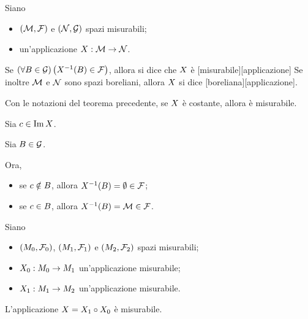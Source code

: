 \begin{Definition}
	Siano
  \begin{itemize}
    \item $(\mathcal{M},\mathcal{F})$ e
      $(\mathcal{N},\mathcal{G})$ spazi misurabili;
    \item un'applicazione $X: \mathcal{M} \rightarrow
      \mathcal{N}$.
  \end{itemize}
  Se $\left ( \forall B \in \mathcal{G} \right ) \left ( X^{-1}(B) \in \mathcal{F} \right )$, allora
  si dice che $X$ \`e
  [misurabile][applicazione]
  Se inoltre $\mathcal{M}$ e $\mathcal{N}$ sono spazi boreliani,
  allora
  $X$ si dice
  [boreliana][applicazione].
\end{Definition}
\begin{Theorem}
  Con le notazioni del teorema precedente,
  se $X$ \`e costante, allora \`e misurabile.
\end{Theorem}
\Proof Sia $c \in \operatorname{Im}{X}$.
\par Sia $B \in \mathcal{G}$.
\par Ora,
\begin{itemize}
  \item se $c \notin B$, allora
    $X^{-1} (B)
    = \emptyset \in \mathcal{F}$;
  \item se $c \in B$, allora
    $X^{-1} (B)
    = \mathcal{M} \in \mathcal{F}$. \EndProof
\end{itemize}
\begin{Theorem}
  Siano
  \begin{itemize}
    \item $(M_0,\mathcal{F}_0)$,
      $(M_1,\mathcal{F}_1)$
      e $(M_2,\mathcal{F}_2)$
      spazi misurabili;
    \item $X_0:
      M_0 \rightarrow M_1$
      un'applicazione misurabile;
    \item $X_1:
      M_1 \rightarrow M_2$
      un'applicazione misurabile.
  \end{itemize}
  L'applicazione
  $X
  = X_1 \circ X_0$ \`e
  misurabile.
\end{Theorem}
